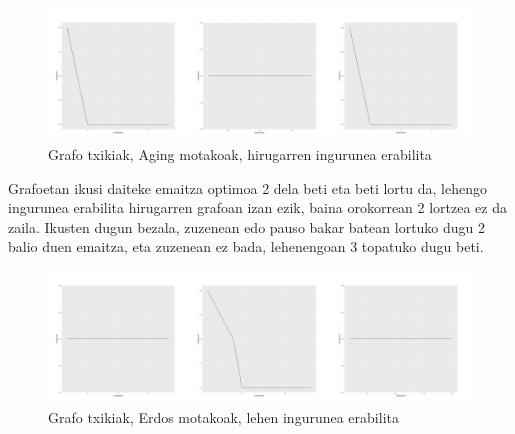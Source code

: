 \documentclass[eu,gi]{ifirak}\usepackage[]{graphicx}\usepackage[]{color}
\makeatletter
\def\maxwidth{ %
  \ifdim\Gin@nat@width>\linewidth
    \linewidth
  \else
    \Gin@nat@width
  \fi
}
\newenvironment{knitrout}{}{} %
\makeatother
\begin{document}
\pagebreak
\begin{center}	
\begin{knitrout}
\color{fgcolor}\begin{figure}[!h]
\includegraphics[width=\maxwidth]{figure/unnamed-chunk-3-1} \caption[Grafo txikiak, Aging motakoak, hirugarren ingurunea erabilita]{Grafo txikiak, Aging motakoak, hirugarren ingurunea erabilita}\label{fig:unnamed-chunk-3}
\end{figure}


\end{knitrout}
\end{center}

Grafoetan ikusi daiteke emaitza optimoa 2 dela beti eta beti lortu da, lehengo ingurunea erabilita hirugarren grafoan izan ezik, baina orokorrean 2 lortzea ez da zaila. Ikusten dugun bezala, zuzenean edo pauso bakar batean lortuko dugu 2 balio duen emaitza, eta zuzenean ez bada, lehenengoan 3 topatuko dugu beti.\\

\begin{center}	
\begin{knitrout}
\color{fgcolor}\begin{figure}[!h]
\includegraphics[width=\maxwidth]{figure/unnamed-chunk-4-1} \caption[Grafo txikiak, Erdos motakoak, lehen ingurunea erabilita]{Grafo txikiak, Erdos motakoak, lehen ingurunea erabilita}\label{fig:unnamed-chunk-4}
\end{figure}


\end{knitrout}
\end{center}
\end{document}
